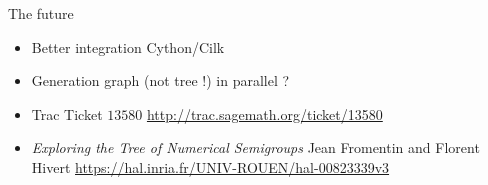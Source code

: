 \documentclass[compress,11pt]{beamer}
\begin{document}
\begin{frame}{The future}
  
  \begin{itemize}
  \item Better integration Cython/Cilk
    \bigskip

  \item Generation graph (not tree !) in parallel ?
  \end{itemize}
  \bigskip  \bigskip

  \begin{itemize}
  \item Trac Ticket $13580$ \url{http://trac.sagemath.org/ticket/13580}
    \bigskip

  \item \textit{Exploring the Tree of Numerical Semigroups}
    Jean Fromentin and Florent Hivert
    \url{https://hal.inria.fr/UNIV-ROUEN/hal-00823339v3}

  \end{itemize}
\end{frame}
\end{document}
